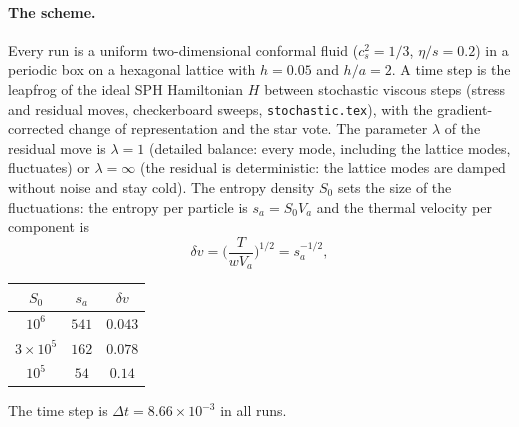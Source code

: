 \documentclass[11pt,aps,preprint,nofootinbib,superscriptaddress,tightenlines]{revtex4-2}
\def\st{\begin{equation}}
\def\stp{\end{equation}}
\let\oldparagraph\paragraph
\renewcommand{\paragraph}{\par\bigskip\oldparagraph}
\begin{document}
\paragraph{The scheme.}  Every run is a uniform two-dimensional conformal fluid
($c_s^2=1/3$, $\eta/s=0.2$) in a periodic box on a hexagonal lattice with $h=0.05$ and
$h/a=2$.  A time step is the leapfrog of the ideal SPH Hamiltonian $H$ between
stochastic viscous steps (stress and residual moves, checkerboard sweeps,
\texttt{stochastic.tex}), with the gradient-corrected change of representation and the
star vote.  The parameter $\lambda$ of the residual move is $\lambda=1$ (detailed
balance: every mode, including the lattice modes, fluctuates) or $\lambda=\infty$ (the
residual is deterministic: the lattice modes are damped without noise and stay cold).
The entropy density $S_0$ sets the size of the fluctuations: the entropy per particle
is $s_a=S_0V_a$ and the thermal velocity per component is
\st
\delta v=\Big(\frac{T}{wV_a}\Big)^{1/2}=s_a^{-1/2},
\stp
\begin{center}
\begin{tabular}{ccc}
\hline
$S_0$ & $s_a$ & $\delta v$ \\ \hline
$10^6$ & $541$ & $0.043$ \\
$3\times10^5$ & $162$ & $0.078$ \\
$10^5$ & $54$ & $0.14$ \\
\hline
\end{tabular}
\end{center}
The time step is $\Delta t=8.66\times10^{-3}$ in all runs.
\end{document}
